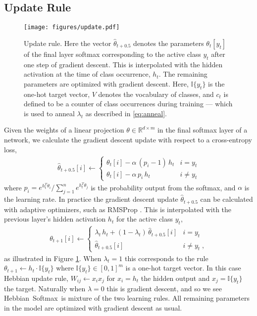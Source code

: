 \documentclass{article} \usepackage{hyperref}
\newcommand{\model}{\hbox{Hebbian Softmax }}
\begin{document}
\subsection{Update Rule}
\begin{figure}
    \centering
    \texttt{[image: figures/update.pdf]}
    \caption{Update rule. Here the vector $\hat\theta_{t+0.5}$ denotes the parameters $\theta_t[y_t]$ of the final layer softmax corresponding to the active class $y_t$ after one step of gradient descent. This is interpolated with the hidden activation at the time of class occurrence, $h_t$. The remaining parameters are optimized with gradient descent. Here, $\mathbb{I}\{y_t\}$ is the one-hot target vector, $V$ denotes the vocabulary of classes, and $c_t$ is defined to be a counter of class occurrences during training --- which is used to anneal $\lambda_t$ as described in \eqref{eq:anneal}. }
    \label{fig:update}
\end{figure}
Given the weights of a linear projection $\theta \in \mathbb{R}^{d \times m}$ in the final softmax layer of a network, we calculate the gradient descent update with respect to a cross-entropy loss,
\begin{align}
    \label{eq:sgd_update}
    \hat\theta_{t + 0.5}[i] \leftarrow
    \begin{cases}
        \theta_t[i] - \alpha \, (p_i - 1) \, h_t & i = y_t \\
        \theta_t[i] - \alpha \, p_i \, h_t & i \neq y_t
    \end{cases}
\end{align}
where $p_i = e^{h_t^T \theta_i} / \sum_{j=1}^{n} e^{h_t^T \theta_j}$ is the probability output from the softmax, and $\alpha$ is the learning rate. In practice the gradient descent update $\hat\theta_{t + 0.5}$ can be calculated with adaptive optimizers, such as RMSProp \citep{tieleman2012lecture}. This is interpolated with the previous layer's hidden activation $h_t$ for the active class $y_t$,
\begin{align}
\label{eq:update_rule_small}
\theta_{t+1}[i] \leftarrow 
    \begin{cases}
        \lambda_t \, h_t + (1 - \lambda_t ) \, \hat\theta_{t+0.5}[i] & i = y_t \\
        \hat\theta_{t+0.5}[i] & i \neq y_t \; ,
    \end{cases}
\end{align}
as illustrated in Figure \ref{fig:update}. When $\lambda_t = 1$ this corresponds to the rule $\theta_{t+1} \leftarrow h_t \cdot \mathbb{I}\{y_t\}$ where $\mathbb{I}\{y_t\} \in [0, 1]^m$ is a one-hot target vector. In this case Hebbian update rule, $W_{ij} \leftarrow x_i x_j$ for $x_i = h_t$ the hidden output and $x_j = \mathbb{I}\{y_t\}$ the target. Naturally when $\lambda = 0$ this is gradient descent, and so we see \model is mixture of the two learning rules. All remaining parameters in the model are optimized with gradient descent as usual. 
\end{document}
